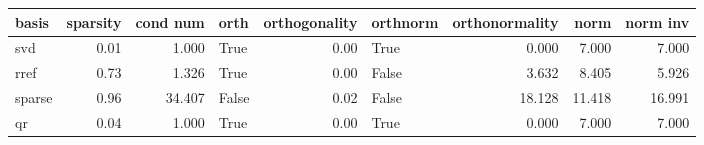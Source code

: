 \begin{tabular}{lrrlrlrrr}
\toprule
 basis &  sparsity &  cond num &  orth &  orthogonality &  orthnorm &  orthonormality &   norm &  norm inv \\
\midrule
   svd &      0.01 &     1.000 &  True &           0.00 &      True &           0.000 &  7.000 &     7.000 \\
  rref &      0.73 &     1.326 &  True &           0.00 &     False &           3.632 &  8.405 &     5.926 \\
sparse &      0.96 &    34.407 & False &           0.02 &     False &          18.128 & 11.418 &    16.991 \\
    qr &      0.04 &     1.000 &  True &           0.00 &      True &           0.000 &  7.000 &     7.000 \\
\bottomrule
\end{tabular}
